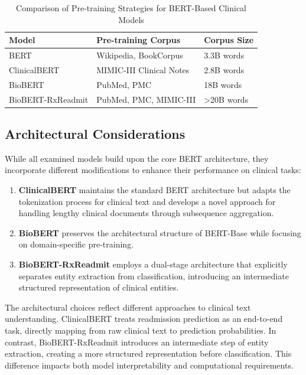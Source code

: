\documentclass[3p,times,procedia]{elsarticle}
\begin{document}
\begin{table}[h]
\centering
\caption{Comparison of Pre-training Strategies for BERT-Based Clinical Models}
\label{tab:pretraining_comparison}
\begin{tabular}{|l|l|l|}
\hline
\textbf{Model} & \textbf{Pre-training Corpus} & \textbf{Corpus Size} \\ \hline
BERT & Wikipedia, BookCorpus & 3.3B words \\ \hline
ClinicalBERT & MIMIC-III Clinical Notes & 2.8B words \\ \hline
BioBERT & PubMed, PMC & 18B words \\ \hline
BioBERT-RxReadmit & PubMed, PMC, MIMIC-III & >20B words \\ \hline
\end{tabular}
\end{table}

\subsection{Architectural Considerations}

While all examined models build upon the core BERT architecture, they incorporate different modifications to enhance their performance on clinical tasks:

\begin{enumerate}
    \item \textbf{ClinicalBERT} maintains the standard BERT architecture but adapts the tokenization process for clinical text and develops a novel approach for handling lengthy clinical documents through subsequence aggregation.
    
    \item \textbf{BioBERT} preserves the architectural structure of BERT-Base while focusing on domain-specific pre-training.
    
    \item \textbf{BioBERT-RxReadmit} employs a dual-stage architecture that explicitly separates entity extraction from classification, introducing an intermediate structured representation of clinical entities.
\end{enumerate}

The architectural choices reflect different approaches to clinical text understanding. ClinicalBERT treats readmission prediction as an end-to-end task, directly mapping from raw clinical text to prediction probabilities. In contrast, BioBERT-RxReadmit introduces an intermediate step of entity extraction, creating a more structured representation before classification. This difference impacts both model interpretability and computational requirements.
\end{document}
